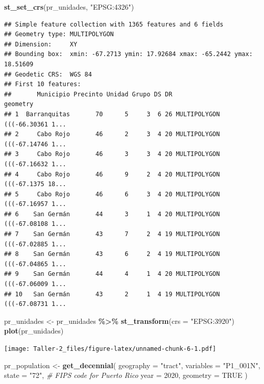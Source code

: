 \documentclass[
]{article}
\newenvironment{Shaded}{\begin{snugshade}}{\end{snugshade}}
\newcommand{\AttributeTok}[1]{\textcolor[rgb]{0.13,0.29,0.53}{#1}}
\newcommand{\CommentTok}[1]{\textcolor[rgb]{0.56,0.35,0.01}{\textit{#1}}}
\newcommand{\ConstantTok}[1]{\textcolor[rgb]{0.56,0.35,0.01}{#1}}
\newcommand{\DecValTok}[1]{\textcolor[rgb]{0.00,0.00,0.81}{#1}}
\newcommand{\FunctionTok}[1]{\textcolor[rgb]{0.13,0.29,0.53}{\textbf{#1}}}
\newcommand{\NormalTok}[1]{#1}
\newcommand{\OtherTok}[1]{\textcolor[rgb]{0.56,0.35,0.01}{#1}}
\newcommand{\SpecialCharTok}[1]{\textcolor[rgb]{0.81,0.36,0.00}{\textbf{#1}}}
\newcommand{\StringTok}[1]{\textcolor[rgb]{0.31,0.60,0.02}{#1}}
\begin{document}
\begin{Shaded}
\begin{Highlighting}[]
\FunctionTok{st\_set\_crs}\NormalTok{(pr\_unidades, }\StringTok{"EPSG:4326"}\NormalTok{)}
\end{Highlighting}
\end{Shaded}

\begin{verbatim}
## Simple feature collection with 1365 features and 6 fields
## Geometry type: MULTIPOLYGON
## Dimension:     XY
## Bounding box:  xmin: -67.2713 ymin: 17.92684 xmax: -65.2442 ymax: 18.51609
## Geodetic CRS:  WGS 84
## First 10 features:
##       Municipio Precinto Unidad Grupo DS DR                       geometry
## 1  Barranquitas       70      5     3  6 26 MULTIPOLYGON (((-66.30361 1...
## 2     Cabo Rojo       46      2     3  4 20 MULTIPOLYGON (((-67.14746 1...
## 3     Cabo Rojo       46      3     3  4 20 MULTIPOLYGON (((-67.16632 1...
## 4     Cabo Rojo       46      9     2  4 20 MULTIPOLYGON (((-67.1375 18...
## 5     Cabo Rojo       46      6     3  4 20 MULTIPOLYGON (((-67.16957 1...
## 6    San Germán       44      3     1  4 20 MULTIPOLYGON (((-67.08108 1...
## 7    San Germán       43      7     2  4 19 MULTIPOLYGON (((-67.02885 1...
## 8    San Germán       43      6     2  4 19 MULTIPOLYGON (((-67.04865 1...
## 9    San Germán       44      4     1  4 20 MULTIPOLYGON (((-67.06009 1...
## 10   San Germán       43      2     1  4 19 MULTIPOLYGON (((-67.08731 1...
\end{verbatim}

\begin{Shaded}
\begin{Highlighting}[]
\NormalTok{pr\_unidades }\OtherTok{\textless{}{-}}\NormalTok{ pr\_unidades }\SpecialCharTok{\%\textgreater{}\%} \FunctionTok{st\_transform}\NormalTok{(}\AttributeTok{crs =} \StringTok{"EPSG:3920"}\NormalTok{)}
\FunctionTok{plot}\NormalTok{(pr\_unidades)}
\end{Highlighting}
\end{Shaded}

\texttt{[image: Taller-2\_files/figure-latex/unnamed-chunk-6-1.pdf]}

\begin{Shaded}
\begin{Highlighting}[]
\NormalTok{pr\_population }\OtherTok{\textless{}{-}} \FunctionTok{get\_decennial}\NormalTok{(}
  \AttributeTok{geography =} \StringTok{"tract"}\NormalTok{, }
  \AttributeTok{variables =} \StringTok{"P1\_001N"}\NormalTok{, }
  \AttributeTok{state =} \StringTok{"72"}\NormalTok{,   }\CommentTok{\# FIPS code for Puerto Rico}
  \AttributeTok{year =} \DecValTok{2020}\NormalTok{, }
  \AttributeTok{geometry =} \ConstantTok{TRUE}
\NormalTok{)}
\end{Highlighting}
\end{Shaded}
\end{document}
